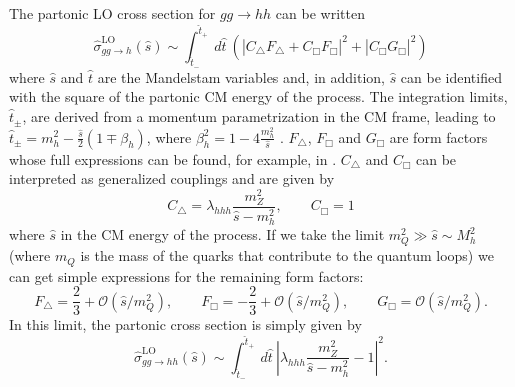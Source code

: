The partonic LO cross section for $gg\rightarrow hh$ can be written
\begin{equation}
\hat{\sigma}^{\text{LO}}_{gg\rightarrow h} (\hat{s}) \sim \int_{\hat{t}_-}^{\hat{t}_+}~d\hat{t}~\left(|C_{\bigtriangleup}F_{\bigtriangleup}+C_{\Box}F_{\Box}|^2+|C_{\Box}G_{\Box}|^2\right)
\end{equation}
where $\hat{s}$ and $\hat{t}$ are the Mandelstam variables and, in addition, $\hat{s}$ can be identified with the square of the partonic CM energy of the process. The integration limits, $\hat{t}_{\pm}$, are derived from a momentum parametrization in the CM frame, leading to $\hat{t}_{\pm}=m_h^2-\frac{\hat{s}}{2}(1\mp \beta_h)$, where $\beta_h^2=1-4\frac{m_h^2}{\hat{s}}$ \cite{HHxs_LO1}. $F_{\bigtriangleup}$, $F_{\Box}$ and $G_{\Box}$ are form factors whose full expressions can be found, for example, in \cite{HHxs_LO}. $C_{\bigtriangleup}$ and $C_{\Box}$ can be interpreted as generalized couplings and are given by
\begin{equation}
C_{\bigtriangleup}=\lambda_{hhh}\frac{m_Z^2}{\hat{s}-m_h^2}, \qquad C_{\Box}=1
\end{equation}
where $\hat{s}$ in the CM energy of the process.  If we take the limit $m_Q^2 \gg \hat{s}\sim M_h^2$ (where $m_Q$ is the mass of the quarks that contribute to the quantum loops) we can get simple expressions for the remaining form factors:
\begin{equation}
F_{\bigtriangleup}=\frac{2}{3} + \mathcal{O}(\hat{s}/m_Q^2), \qquad F_{\Box}=-\frac{2}{3} + \mathcal{O}(\hat{s}/m_Q^2), \qquad G_{\Box}=\mathcal{O}(\hat{s}/m_Q^2).
\end{equation}
In this limit, the partonic cross section is simply given by 
\begin{equation}
\hat{\sigma}^{\text{LO}}_{gg\rightarrow hh}(\hat{s}) \sim \int_{\hat{t}_-}^{\hat{t}_+}~d\hat{t}~ |\lambda_{hhh}\frac{m_Z^2}{\hat{s}-m_h^2}-1|^2.
\label{eq:xsparton}
\end{equation}

%

